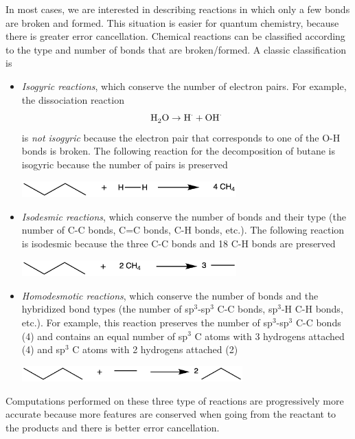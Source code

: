 \documentclass[../Main/chem371-notes.tex]{subfiles}
\begin{document}
In most cases, we are interested in describing reactions in which only a few bonds are broken and formed.
This situation is easier for quantum chemistry, because there is greater error cancellation.
Chemical reactions can be classified according to the type and number of bonds that are broken/formed.
A classic classification is
\begin{itemize}
\item \emph{Isogyric reactions}, which conserve the number of electron pairs.
For example, the dissociation reaction
\begin{equation}
\ce{H2O} \rightarrow \ce{H}^\cdot + \ce{OH}^\cdot
\end{equation}
is \emph{not isogyric} because the electron pair that corresponds to one of the O-H bonds is broken.
The following reaction for the decomposition of butane is isogyric because the number of pairs is preserved

\begin{center}
\includegraphics[width=3.25in]{img/isogyric.png}
\end{center}

\item \emph{Isodesmic reactions}, which conserve the number of bonds and their type (the number of C-C bonds, C=C bonds, C-H bonds, etc.).
The following reaction is isodesmic because the three C-C bonds and 18 C-H bonds are preserved

\begin{center}
\includegraphics[width=3.25in]{img/isodesmic.png}
\end{center}

\item \emph{Homodesmotic reactions}, which conserve the number of bonds and the hybridized bond types (the number of sp$^3$-sp$^3$ C-C bonds, sp$^3$-H C-H bonds, etc.).
For example, this reaction preserves the number of sp$^3$-sp$^3$ C-C bonds (4) and contains an equal number of sp$^3$ C atoms with 3 hydrogens attached (4) and sp$^3$ C atoms with 2 hydrogens attached (2)

\begin{center}
\includegraphics[width=3.35in]{img/homodesmotic.png}
\end{center}

\end{itemize}
Computations performed on these three type of reactions are progressively more accurate because more features are conserved when going from the reactant to the products and there is better error cancellation.
\end{document}
